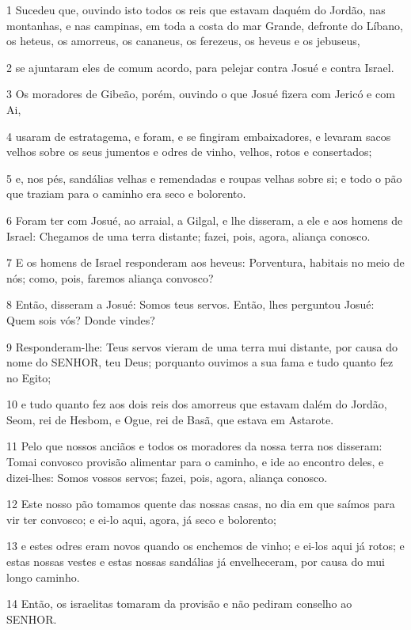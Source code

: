 \par 1 Sucedeu que, ouvindo isto todos os reis que estavam daquém do Jordão, nas montanhas, e nas campinas, em toda a costa do mar Grande, defronte do Líbano, os heteus, os amorreus, os cananeus, os ferezeus, os heveus e os jebuseus,
\par 2 se ajuntaram eles de comum acordo, para pelejar contra Josué e contra Israel.
\par 3 Os moradores de Gibeão, porém, ouvindo o que Josué fizera com Jericó e com Ai,
\par 4 usaram de estratagema, e foram, e se fingiram embaixadores, e levaram sacos velhos sobre os seus jumentos e odres de vinho, velhos, rotos e consertados;
\par 5 e, nos pés, sandálias velhas e remendadas e roupas velhas sobre si; e todo o pão que traziam para o caminho era seco e bolorento.
\par 6 Foram ter com Josué, ao arraial, a Gilgal, e lhe disseram, a ele e aos homens de Israel: Chegamos de uma terra distante; fazei, pois, agora, aliança conosco.
\par 7 E os homens de Israel responderam aos heveus: Porventura, habitais no meio de nós; como, pois, faremos aliança convosco?
\par 8 Então, disseram a Josué: Somos teus servos. Então, lhes perguntou Josué: Quem sois vós? Donde vindes?
\par 9 Responderam-lhe: Teus servos vieram de uma terra mui distante, por causa do nome do SENHOR, teu Deus; porquanto ouvimos a sua fama e tudo quanto fez no Egito;
\par 10 e tudo quanto fez aos dois reis dos amorreus que estavam dalém do Jordão, Seom, rei de Hesbom, e Ogue, rei de Basã, que estava em Astarote.
\par 11 Pelo que nossos anciãos e todos os moradores da nossa terra nos disseram: Tomai convosco provisão alimentar para o caminho, e ide ao encontro deles, e dizei-lhes: Somos vossos servos; fazei, pois, agora, aliança conosco.
\par 12 Este nosso pão tomamos quente das nossas casas, no dia em que saímos para vir ter convosco; e ei-lo aqui, agora, já seco e bolorento;
\par 13 e estes odres eram novos quando os enchemos de vinho; e ei-los aqui já rotos; e estas nossas vestes e estas nossas sandálias já envelheceram, por causa do mui longo caminho.
\par 14 Então, os israelitas tomaram da provisão e não pediram conselho ao SENHOR.
